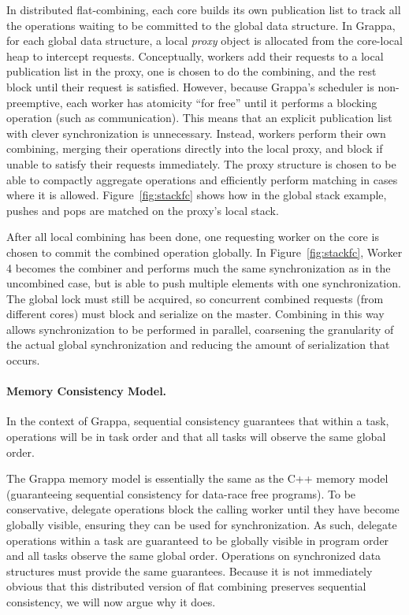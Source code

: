 In distributed flat-combining, each core builds its own publication list to track all the operations waiting to be committed to the global data structure.
In Grappa, for each global data structure, a local \emph{proxy} object is allocated from the core-local heap to intercept requests.
Conceptually, workers add their requests to a local publication list in the proxy, one is chosen to do the combining, and the rest block until their request is satisfied.
However, because Grappa's scheduler is non-preemptive, each worker has atomicity ``for free'' until it performs a blocking operation (such as communication).
This means that an explicit publication list with clever synchronization is unnecessary.
Instead, workers perform their own combining, merging their operations directly into the local proxy, and block if unable to satisfy their requests immediately.
The proxy structure is chosen to be able to compactly aggregate operations and efficiently perform matching in cases where it is allowed. Figure~\ref{fig:stackfc} shows how in the global stack example, pushes and pops are matched on the proxy's local stack.

After all local combining has been done, one requesting worker on the core is chosen to commit the combined operation globally. In Figure~\ref{fig:stackfc}, Worker 4 becomes the combiner and performs much the same synchronization as in the uncombined case, but is able to push multiple elements with one synchronization. The global lock must still be acquired, so concurrent combined requests (from different cores) must block and serialize on the master. Combining in this way allows synchronization to be performed in parallel, coarsening the granularity of the actual global synchronization and reducing the amount of serialization that occurs.

\paragraph{Memory Consistency Model.}
\label{sec:memory-model}
In the context of Grappa, sequential consistency guarantees that within a
task, operations will be in task order and that all tasks will observe the
same global order.

The Grappa memory model is essentially the same as the C++ memory
model~\cite{boehm:drf0,N2480,N2800} (guaranteeing sequential
consistency for data-race free programs). To be conservative, delegate
operations block the calling worker until they have become globally visible,
ensuring they can be used for synchronization. As such, delegate operations
within a task are guaranteed to be globally visible in program order and all
tasks observe the same global order.
Operations on synchronized data structures must provide the same guarantees.
Because it is not immediately obvious
that this distributed version of flat combining preserves sequential
consistency, we will now argue why it does.

